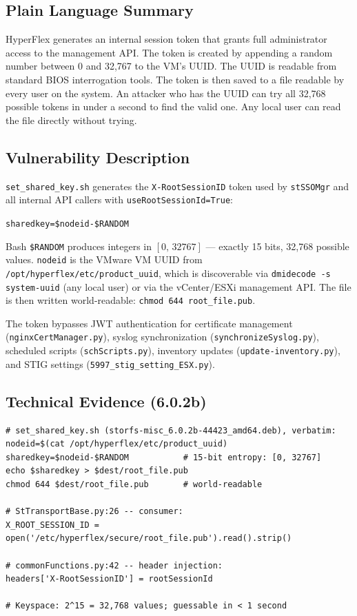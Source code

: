 \documentclass[11pt,a4paper]{article}
\begin{document}
\subsection*{Plain Language Summary}

HyperFlex generates an internal session token that grants full administrator
access to the management API. The token is created by appending a random number
between 0 and 32,767 to the VM's UUID. The UUID is readable from standard BIOS
interrogation tools. The token is then saved to a file readable by every user on
the system. An attacker who has the UUID can try all 32,768 possible tokens in
under a second to find the valid one. Any local user can read the file directly
without trying.

\subsection*{Vulnerability Description}

\texttt{set\_shared\_key.sh} generates the \texttt{X-RootSessionID} token
used by \texttt{stSSOMgr} and all internal API callers with
\texttt{useRootSessionId=True}:

\begin{center}
\texttt{sharedkey=\$nodeid-\$RANDOM}
\end{center}

Bash \texttt{\$RANDOM} produces integers in $[0,\,32767]$ --- exactly 15 bits,
32,768 possible values. \texttt{nodeid} is the VMware VM UUID from
\texttt{/opt/hyperflex/etc/product\_uuid}, which is discoverable via
\texttt{dmidecode -s system-uuid} (any local user) or via the vCenter/ESXi
management API. The file is then written world-readable:
\texttt{chmod 644 root\_file.pub}.

The token bypasses JWT authentication for certificate management
(\texttt{nginxCertManager.py}), syslog synchronization
(\texttt{synchronizeSyslog.py}), scheduled scripts (\texttt{schScripts.py}),
inventory updates (\texttt{update-inventory.py}), and STIG settings
(\texttt{5997\_stig\_setting\_ESX.py}).

\subsection*{Technical Evidence (6.0.2b)}

\begin{lstlisting}
# set_shared_key.sh (storfs-misc_6.0.2b-44423_amd64.deb), verbatim:
nodeid=$(cat /opt/hyperflex/etc/product_uuid)
sharedkey=$nodeid-$RANDOM           # 15-bit entropy: [0, 32767]
echo $sharedkey > $dest/root_file.pub
chmod 644 $dest/root_file.pub       # world-readable

# StTransportBase.py:26 -- consumer:
X_ROOT_SESSION_ID = open('/etc/hyperflex/secure/root_file.pub').read().strip()

# commonFunctions.py:42 -- header injection:
headers['X-RootSessionID'] = rootSessionId

# Keyspace: 2^15 = 32,768 values; guessable in < 1 second
\end{lstlisting}
\end{document}
